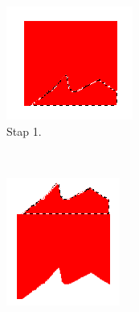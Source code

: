 \documentclass{article}
\begin{document}
\begin{figure}[Hh]
	\centering
	\begin{subfigure}[b]{0.3\textwidth}    
        \includegraphics[width=\textwidth]{piece1.png}
        \caption{Stap 1.}
        \label{fig:stap1}
    \end{subfigure}%
    ~
    \begin{subfigure}[b]{0.3\textwidth}    
        \includegraphics[width=\textwidth]{piece2.png}

\end{subfigure}
\end{figure}
\end{document}
